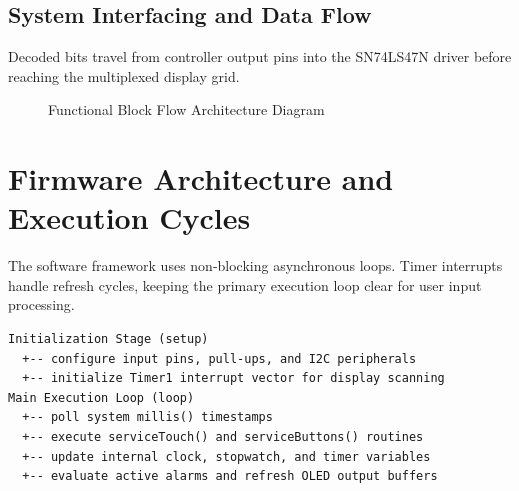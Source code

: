 \documentclass[12pt,letterpaper]{article}
\begin{document}
\subsection{System Interfacing and Data Flow}
Decoded bits travel from controller output pins into the SN74LS47N driver before reaching the multiplexed display grid.

\begin{figure}[H]
\centering
{}
\caption{Functional Block Flow Architecture Diagram}
\label{fig:functional-flow-redesigned}
\end{figure}

\clearpage
\section{Firmware Architecture and Execution Cycles}

The software framework uses non-blocking asynchronous loops. Timer interrupts handle refresh cycles, keeping the primary execution loop clear for user input processing.

\begin{lstlisting}[style=ArchitectureFlow]
Initialization Stage (setup)
  +-- configure input pins, pull-ups, and I2C peripherals
  +-- initialize Timer1 interrupt vector for display scanning
Main Execution Loop (loop)
  +-- poll system millis() timestamps
  +-- execute serviceTouch() and serviceButtons() routines
  +-- update internal clock, stopwatch, and timer variables
  +-- evaluate active alarms and refresh OLED output buffers
\end{lstlisting}
\end{document}
